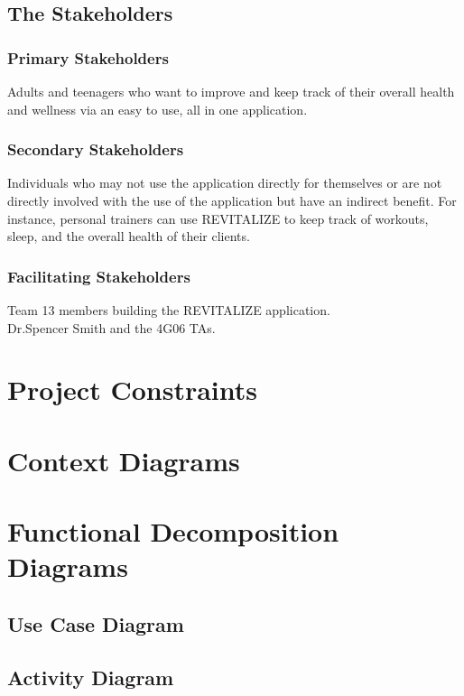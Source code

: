 \documentclass[12pt,letterpaper]{article}
\begin{document}
\subsection{The Stakeholders}

\subsubsection{Primary Stakeholders}
Adults and teenagers who want to improve and keep track of their overall health and wellness via an easy to use, all in one application.

\subsubsection{Secondary Stakeholders}
Individuals who may not use the application directly for themselves
or are not directly involved with the use of the application but have an indirect benefit. For instance, personal trainers can use REVITALIZE to keep track of workouts, sleep, and the overall health of their clients.

\subsubsection{Facilitating Stakeholders}
Team 13 members building the REVITALIZE application. \\
Dr.Spencer Smith and the 4G06 TAs.

\section{Project Constraints}

\section{Context Diagrams}

\section{Functional Decomposition Diagrams}

\subsection{Use Case Diagram}

\subsection{Activity Diagram}
\end{document}
